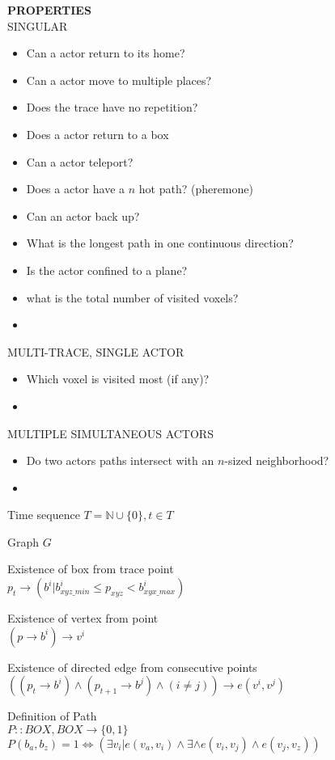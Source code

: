 \documentclass{article}
\newcommand\N{\mathbb{N}}
\begin{document}
\textbf{PROPERTIES}\\
SINGULAR\\
\begin{itemize}
  \item Can a actor return to its home?
  \item Can a actor move to multiple places?
  \item Does the trace have no repetition?
  \item Does a actor return to a box
  \item Can a actor teleport? 
  \item Does a actor have a $n$ hot path? (pheremone)
  \item Can an actor back up?
  \item What is the longest path in one continuous direction?
  \item Is the actor confined to a plane?
  \item what is the total number of visited voxels?
  \item
\end{itemize}

MULTI-TRACE, SINGLE ACTOR\\
\begin{itemize}
  \item Which voxel is visited most (if any)?
  \item 
\end{itemize}

MULTIPLE SIMULTANEOUS ACTORS\\
\begin{itemize}
  \item Do two actors paths intersect with an $n$-sized neighborhood?
  \item 
\end{itemize}


Time sequence
$T =  \N \cup \{0\}, t \in T$

Graph $G$


Existence of box from trace point\\
$p_t \rightarrow (b^i | b_{xyz\_min}^i \leq p_{xyz} < b_{xyx\_max}^i)$


Existence of vertex from point\\
$(p \rightarrow b^i) \rightarrow v^i$

Existence of directed edge from consecutive points\\
$((p_t \rightarrow b^i) \land (p_{t+1} \rightarrow b^j) \land (i \neq j)) \rightarrow e(v^i, v^j) $


Definition of Path\\
$P ::  BOX, BOX \rightarrow \{0,1\}$\\
$P(b_a, b_z) = 1 \Leftrightarrow (\exists v_i | e(v_a, v_i) \land \exists \land e(v_i, v_j) \land e(v_j, v_z)) $

\end{document}
